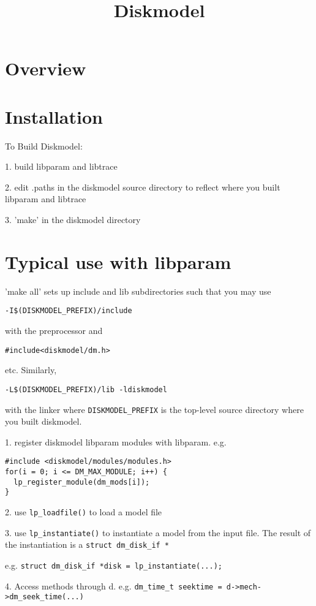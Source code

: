 \documentclass{article}
\begin{document}
\title{Diskmodel}
\maketitle

\section{Overview}





\section{Installation}
To Build Diskmodel:

1.  build libparam and libtrace 

2.  edit .paths in the diskmodel source directory to reflect where
you built libparam and libtrace

3.  'make' in the diskmodel directory

\section{Typical use with libparam}

'make all' sets up include and lib subdirectories such that
you may use 
\begin{verbatim}-I$(DISKMODEL_PREFIX)/include \end{verbatim}
with the preprocessor and 
\begin{verbatim}#include<diskmodel/dm.h> \end{verbatim} etc.  Similarly, 
\begin{verbatim}-L$(DISKMODEL_PREFIX)/lib -ldiskmodel \end{verbatim} 
with the linker where \texttt{DISKMODEL\_PREFIX} is the top-level
source directory where you built diskmodel.


1.  register diskmodel libparam modules with libparam. e.g.
\begin{verbatim}
#include <diskmodel/modules/modules.h>
for(i = 0; i <= DM_MAX_MODULE; i++) {
  lp_register_module(dm_mods[i]);
}
\end{verbatim}

2.  use \texttt{lp\_loadfile()} to load a model file

3.  use \texttt{lp\_instantiate()} to instantiate a model from the
input file.  The result of the instantiation is a \texttt{struct
dm\_disk\_if *}

e.g. \texttt{struct dm\_disk\_if *disk = lp\_instantiate(...);}


4.  Access methods through d.
e.g. \texttt{dm\_time\_t seektime = d->mech->dm\_seek\_time(...)}



\end{document}
